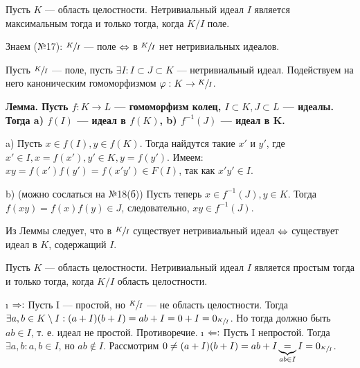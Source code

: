 \begin{problem}
Пусть $K$ --- область целостности. Нетривиальный идеал $I$ является максимальным тогда и только тогда, когда $K/I$ поле.
\end{problem}

\begin{solution}
Знаем (№17): \(\sfrac{K}{I}\) --- поле \(\Leftrightarrow\) в \(\sfrac{K}{I}\) нет нетривиальных идеалов.

Пусть \(\sfrac{K}{I}\) --- поле, пусть \(\exists I: I \subset J \subset K\) --- нетривиальный идеал. Подействуем на него каноническим гомоморфизмом \(\varphi: K \to \sfrac{K}{I}\).

\bf{Лемма.} Пусть \(f: K \to L\) --- гомоморфизм колец, \(I \subset K, J \subset L\) --- идеалы. Тогда a) \(f(I)\) --- идеал в \(f (K)\), b) \(f^{-1} (J)\) --- идеал в K.

\begin{solution}
a) Пусть $x \in f(I), y \in f(K)$. Тогда найдутся такие $x'$ и $y'$, где $x' \in I, x = f(x'), y' \in K, y = f(y')$.
    Имеем: $xy = f(x')f(y') = f (x' y') \in F(I)$, так как $x' y' \in I$.
    
b) (можно сослаться на №18(б)) Пусть теперь $x \in f^{-1}(J), y \in K$. Тогда $f(xy) = f(x)f(y) \in J$, следовательно, $xy \in f^{-1}(J)$.
\end{solution}

Из Леммы следует, что в \(\sfrac{K}{I}\) существует нетривиальный идеал \(\Leftrightarrow\) существует идеал в \(K\), содержащий \(I\).

\end{solution}

\begin{problem}[22(4.7)]
Пусть $K$ --- область целостности. Нетривиальный идеал $I$ является простым тогда и только тогда, когда $K/I$ область целостности.
\end{problem}

\begin{solution}

\begin{itemize}
\tightlist
\i
  \(\Rightarrow:\)
  Пусть I --- простой, но \(\sfrac{K}{I}\) --- не область целостности. Тогда \(\exists a, b \in K\setminus I: (a+I)(b+I) = ab+I = 0+I = 0_{\sfrac{K}{I}}\). Но тогда должно быть \(ab \in I\), т. е. идеал не простой. Противоречие.
\i
  \(\Leftarrow:\)
  Пусть I непростой. Тогда \(\exists a, b: a, b \in I\), но \(ab \not\in I\). Рассмотрим \(0 \ne (a+I)(b+I) = ab + I \underbrace{=}_{ab \in I} I = 0_{\sfrac{K}{I}}\).
\end{itemize}

\end{solution}

